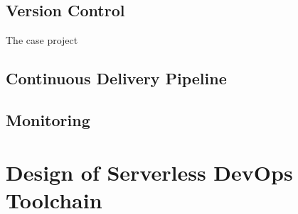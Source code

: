 \subsection{Version Control}
The case project 
\subsection{Continuous Delivery Pipeline}
\subsection{Monitoring}
\section{Design of Serverless DevOps Toolchain}

